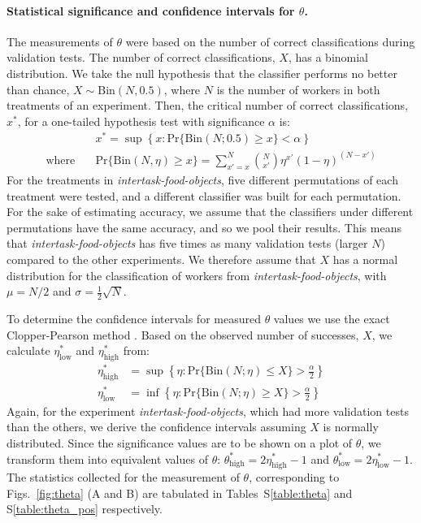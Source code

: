 \documentclass[12pt]{article}
\begin{document}
\paragraph{Statistical significance and confidence intervals for $\theta$.}
The measurements of $\theta$ were based on the number of correct 
classifications during validation tests.  The number of correct 
classifications, $X$, has a binomial distribution.  
We take the null hypothesis that the classifier performs
no better than chance, $X \sim \mathrm{Bin}(N,0.5)$, where $N$ is the number 
of workers in both treatments of an experiment.  Then, the critical number 
of correct classifications, $x^*$, for a one-tailed hypothesis test with
significance $\alpha$ is:
\begin{align}
	&x^* = \sup \left\{
			x: \mathrm{Pr}\{ \mathrm{Bin}(N;0.5) \geq x \} < \alpha
		\right\}\\
	\text{where}\quad &\mathrm{Pr}\{ \mathrm{Bin}(N,\eta) \geq x \} = 
		\sum_{x'=x}^{N} \binom{N}{x'}\eta^{x'}(1-\eta)^{(N-x')}
\end{align}
For the treatments in \textit{intertask-food-objects}, five different 
permutations of each treatment were tested, and a different classifier was 
built for each permutation.  For the sake of estimating accuracy, we assume
that the classifiers under different permutations have the same accuracy,
and so we pool their results.  This means that 
\textit{intertask-food-objects} has five times as many validation tests
(larger $N$) compared to the other experiments.  We therefore assume 
that $X$ has a normal distribution for the classification of workers from
\textit{intertask-food-objects}, with $\mu=N/2$ and 
$\sigma = \frac{1}{2}\sqrt{N}$.

To determine the confidence intervals for measured $\theta$ values we 
use the exact Clopper-Pearson method \cite{clopper1934use}.  
Based on the observed number of successes, $X$, we calculate 
$\eta^*_\mathrm{low}$ and $\eta^*_\mathrm{high}$ from:
\begin{align}
	\eta^*_\mathrm{high} &= \sup
		\left\{
			\eta : \mathrm{Pr}\{\mathrm{Bin}(N; \eta) \leq X \} > 
				\frac{\alpha}{2}
		\right\} \\
	\eta^*_\mathrm{low} &= \inf
		\left\{
			\eta : \mathrm{Pr}\{\mathrm{Bin}(N; \eta) \geq X \} > 
				\frac{\alpha}{2}
		\right\}
\end{align}
Again, for the experiment \textit{intertask-food-objects}, which had 
more validation tests than the others, we derive the confidence intervals
assuming $X$ is normally distributed.
Since the significance values are to be shown on a plot of $\theta$, we 
transform them into equivalent values of 
$\theta$: $\theta^*_\mathrm{high} = 2\eta^*_\mathrm{high} - 1$ and 
$\theta^*_\mathrm{low} = 2\eta^*_\mathrm{low} - 1$.
The statistics collected for the measurement of $\theta$, corresponding to
Figs.~\ref{fig:theta} (A and B) are tabulated in Tables~S\ref{table:theta} and
S\ref{table:theta_pos} respectively.
\end{document}
